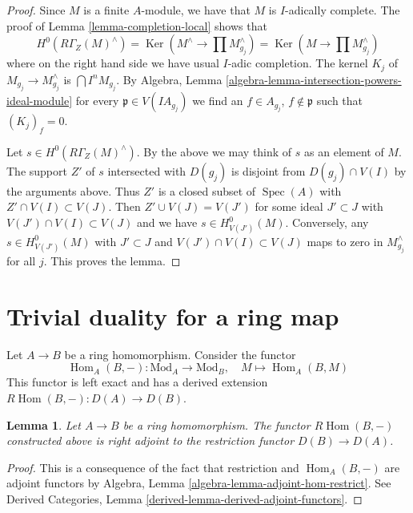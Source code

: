 \documentclass{stacks-project}
\theoremstyle{plain}
\newtheorem{lemma}[subsection]{Lemma}
\theoremstyle{definition}
\theoremstyle{remark}
\numberwithin{equation}{subsection}
\def\Spec{\mathop{\mathrm{Spec}}}
\def\Hom{\mathop{\mathrm{Hom}}\nolimits}
\def\Ker{\mathop{\mathrm{Ker}}}
\begin{document}
\begin{proof}
Since $M$ is a finite $A$-module, we have that $M$ is $I$-adically complete.
The proof of Lemma \ref{lemma-completion-local} shows that
$$
H^0(R\Gamma_Z(M)^\wedge) =
\Ker(M^\wedge \to \prod M_{g_j}^\wedge) =
\Ker(M \to \prod M_{g_j}^\wedge)
$$
where on the right hand side we have usual $I$-adic completion.
The kernel $K_j$ of $M_{g_j} \to M_{g_j}^\wedge$ is $\bigcap I^n M_{g_j}$.
By Algebra, Lemma \ref{algebra-lemma-intersection-powers-ideal-module}
for every $\mathfrak p \in V(IA_{g_j})$ we find an
$f \in A_{g_j}$, $f \not \in \mathfrak p$ such that $(K_j)_f = 0$.

\medskip\noindent
Let $s \in H^0(R\Gamma_Z(M)^\wedge)$.
By the above we may think of $s$ as an element of $M$.
The support $Z'$ of $s$ intersected with $D(g_j)$ is disjoint from
$D(g_j) \cap V(I)$ by the arguments above.
Thus $Z'$ is a closed subset of $\Spec(A)$ with $Z' \cap V(I) \subset V(J)$.
Then $Z' \cup V(J) = V(J')$ for some ideal $J' \subset J$ with
$V(J') \cap V(I) \subset V(J)$ and we have $s \in H^0_{V(J')}(M)$.
Conversely, any $s \in H^0_{V(J')}(M)$ with $J' \subset J$ and
$V(J') \cap V(I) \subset V(J)$ maps to zero in $M_{g_j}^\wedge$ for all $j$.
This proves the lemma.
\end{proof}









\section{Trivial duality for a ring map}
\label{section-trivial}

\noindent
Let $A \to B$ be a ring homomorphism. Consider the functor
$$
\Hom_A(B, -) : \text{Mod}_A \longrightarrow \text{Mod}_B,\quad
M \longmapsto \Hom_A(B, M)
$$
This functor is left exact and has a derived extension
$R\Hom(B, -) : D(A) \to D(B)$.

\begin{lemma}
\label{lemma-right-adjoint}
Let $A \to B$ be a ring homomorphism. The functor $R\Hom(B, -)$
constructed above is right adjoint to the restriction functor
$D(B) \to D(A)$.
\end{lemma}

\begin{proof}
This is a consequence of the fact that restriction and $\Hom_A(B, -)$ are
adjoint functors by Algebra, Lemma \ref{algebra-lemma-adjoint-hom-restrict}.
See Derived Categories, Lemma \ref{derived-lemma-derived-adjoint-functors}.
\end{proof}
\end{document}
